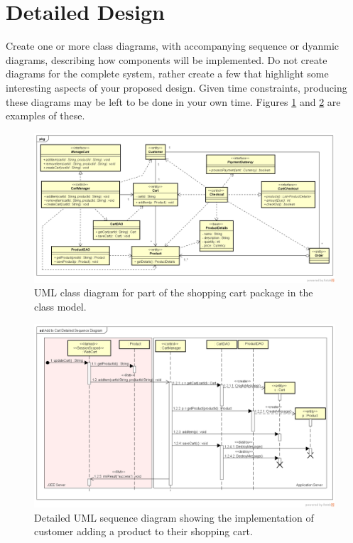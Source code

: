 \documentclass{csse4400}
\begin{document}
\filbreak\newpage
\section{Detailed Design}
Create one or more class diagrams, with accompanying sequence or dyanmic diagrams, describing how components will be implemented.
Do not create diagrams for the complete system, rather create a few that highlight some interesting aspects of your proposed design.
Given time constraints, producing these diagrams may be left to be done in your own time.
Figures \ref{fig:uml_class} and \ref{fig:uml_detailed_sequence} are examples of these.

\begin{figure}[h]
    \centering
    \begin{adjustwidth}{-10.5mm}{-11mm}
        \includegraphics[trim=22 45 22 44,clip,width=0.98\paperwidth]{../../notes/views/images/uml/shopping_cart_class_diagram.png}
    \end{adjustwidth}
    \caption{UML class diagram for part of the shopping cart package in the class model.}
    \label{fig:uml_class}
\end{figure}

\begin{figure}[h!]
    \centering
    \begin{adjustwidth}{-11mm}{-11mm}
        \includegraphics[trim=35 70 31 49,clip,width=0.98\paperwidth]{../../notes/views/images/uml/detailed_sequence_diagram.png}
    \end{adjustwidth}
    \caption{Detailed UML sequence diagram showing the implementation of customer adding a product to their shopping cart.}
    \label{fig:uml_detailed_sequence}
\end{figure}
\end{document}
